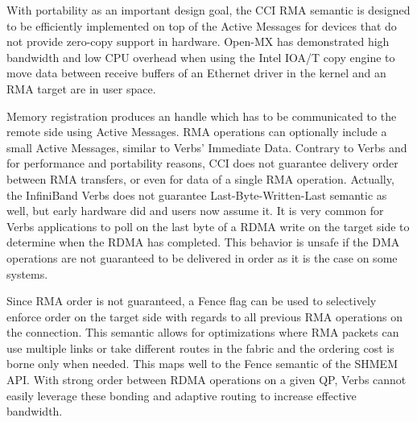 With portability as an important design goal, the CCI RMA semantic is 
designed to be efficiently implemented on top of the Active Messages 
for devices that do not provide zero-copy support in hardware. 
Open-MX\cite{Gog11ParCo} has demonstrated high bandwidth and low CPU 
overhead when using the Intel IOA/T copy engine to move data between receive 
buffers of an Ethernet driver in the kernel and an RMA target are in user 
space.

Memory registration produces an handle which has to be communicated to the 
remote side using Active Messages. RMA operations can optionally include a 
small Active Messages, similar to Verbs' Immediate Data. Contrary to Verbs 
and for performance and portability reasons, CCI does not guarantee delivery 
order between RMA transfers, or even for data of a single RMA operation. 
Actually, the InfiniBand Verbs does not guarantee Last-Byte-Written-Last 
semantic as well, but early hardware did and users now assume it. It is 
very common for Verbs applications to poll on the last byte of a RDMA write 
on the target side to determine when the RDMA has completed. This behavior is 
unsafe if the DMA operations are not guaranteed to be delivered in order as 
it is the case on some systems.

Since RMA order is not guaranteed, a Fence flag can be used to selectively 
enforce order on the target side with regards to all previous RMA operations 
on the connection. This semantic allows for optimizations where RMA packets 
can use multiple links or take different routes in the fabric and the ordering 
cost is borne only when needed. This maps well to the Fence semantic of the 
SHMEM~\cite{openshmem} API. With strong order between RDMA operations on a 
given QP, Verbs cannot easily leverage these bonding and adaptive routing to 
increase effective bandwidth.
